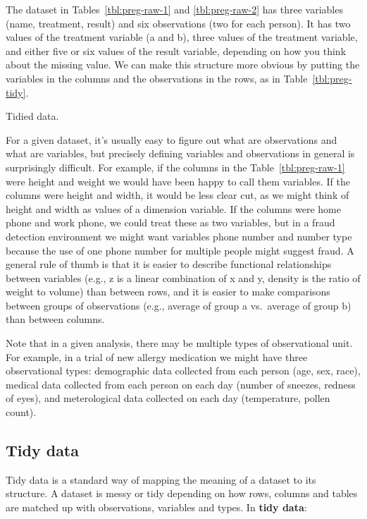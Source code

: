 \documentclass[article]{jss}
\begin{document}
The dataset in Tables~\ref{tbl:preg-raw-1} and \ref{tbl:preg-raw-2} has three variables (name, treatment, result) and six observations (two for each person). It has two values of the treatment variable (a and b), three values of the treatment variable, and either five or six values of the result variable, depending on how you think about the missing value.  We can make this structure more obvious by putting the variables in the columns and the observations in the rows, as in Table~\ref{tbl:preg-tidy}.

\begin{table}[htbp]
  \centering
  
  \caption{Tidied data.}
  \label{tbl:preg-tidy}
\end{table}

For a given dataset, it's usually easy to figure out what are observations and what are variables, but precisely defining variables and observations in general is surprisingly difficult. For example, if the columns in the Table~\ref{tbl:preg-raw-1} were height and weight we would have been happy to call them variables. If the columns were height and width, it would be less clear cut, as we might think of height and width as values of a dimension variable. If the columns were home phone and work phone, we could treat these as two variables, but in a fraud detection environment we might want variables phone number and number type because the use of one phone number for multiple people might suggest fraud. A general rule of thumb is that it is easier to describe functional relationships between variables (e.g., z is a linear combination of x and y, density is the ratio of weight to volume) than between rows, and it is easier to make comparisons between groups of observations (e.g., average of group a vs.\ average of group b) than between columns.

Note that in a given analysis, there may be multiple types of observational unit. For example, in a trial of new allergy medication we might have three observational types: demographic data collected from each person (age, sex, race), medical data collected from each person on each day (number of sneezes, redness of eyes), and meterological data collected on each day (temperature, pollen count).

\subsection{Tidy data}

Tidy data is a standard way of mapping the meaning of a dataset to its structure. A dataset is messy or tidy depending on how rows, columns and tables are matched up with observations, variables and types. In \textbf{tidy data}:
\end{document}
